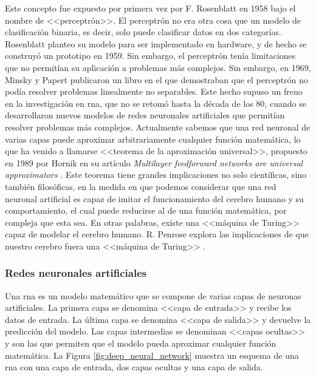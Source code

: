 Este concepto fue expuesto por primera vez por F. Rosenblatt en 1958 \citep{rothmanTransformersNaturalLanguage2021} bajo el nombre de <<perceptrón>>. El perceptrón no era otra cosa que un modelo de clasificación binaria, es decir, solo puede clasificar datos en dos categorías. Rosenblatt planteo su modelo para ser implementado en hardware, y de hecho se construyó un prototipo en 1959. Sin embargo, el perceptrón tenía limitaciones que no permitían su aplicación a problemas más complejos. Sin embargo, en 1969, Minsky y Papert publicaron un libro \citep{minsky1969perceptrons} en el que demostraban que el perceptrón no podía resolver problemas linealmente no separables. Este hecho supuso un freno en la investigación en \gls{rna}, que no se retomó hasta la década de los 80, cuando se desarrollaron nuevos modelos de redes neuronales artificiales que permitían resolver problemas más complejos. Actualmente sabemos que una red neuronal de varias capas puede aproximar arbitrariamente cualquier función matemática, lo que ha venido a llamarse <<teorema de la aproximación universal>>, propuesto en 1989 por Hornik en su artículo \textit{Multilayer feedforward networks are universal approximators} \citep{hornikMultilayerFeedforwardNetworks1989}. Este teorema tiene grandes implicaciones no solo científicas, sino también filosóficas, en la medida en que podemos considerar que una red neuronal artificial es capaz de imitar el funcionamiento del cerebro humano y su comportamiento, el cual puede reducirse al de una función matemática, por compleja que esta sea. En otras palabras, existe una <<máquina de Turing>> capaz de modelar el cerebro humano. R. Penrose explora las implicaciones de que nuestro cerebro fuera una <<máquina de Turing>> \citep{penroseNuevaMenteEmperador2015}.


\subsubsection{Redes neuronales artificiales}
Una \gls{rna} es un modelo matemático que se compone de varias capas de neuronas artificiales. La primera capa se denomina <<capa de entrada>> y recibe los datos de entrada. La última capa se denomina <<capa de salida>> y devuelve la predicción del modelo. Las capas intermedias se denominan <<capas ocultas>> y son las que permiten que el modelo pueda aproximar cualquier función matemática. La Figura \ref{fig:deep_neural_network} muestra un esquema de una \gls{rna} con una capa de entrada, dos capas ocultas y una capa de salida.

